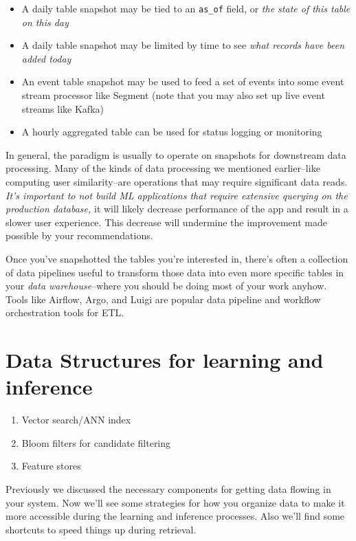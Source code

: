 \begin{itemize}
\item A daily table snapshot may be tied to an \lstinline{as_of} field, or \emph{the state of this table on this day}
\item A daily table snapshot may be limited by time to see \emph{what records have been added today}
\item An event table snapshot may be used to feed a set of events into some event stream processor like Segment (note that you may also set up live event streams like Kafka)
\item A hourly aggregated table can be used for status logging or monitoring
\end{itemize}

In general, the paradigm is usually to operate on snapshots for downstream data processing. Many of the kinds of data processing we mentioned earlier–like computing user similarity–are operations that may require significant data reads. \emph{It's important to not build ML applications that require extensive querying on the production database,} it will likely decrease performance of the app and result in a slower user experience. This decrease will undermine the improvement made possible by your recommendations. 

Once you've snapshotted the tables you're interested in, there's often a collection of data pipelines useful to transform those data into even more specific tables in your \emph{data warehouse}–where you should be doing most of your work anyhow. Tools like Airflow, Argo, and Luigi are popular data pipeline and workflow orchestration tools for ETL. 

\section{Data Structures for learning and inference}

\begin{enumerate}
    \item Vector search/ANN index
    \item Bloom filters for candidate filtering
    \item Feature stores
\end{enumerate}

Previously we discussed the necessary components for getting data flowing in your system. Now we'll see some strategies for how you organize data to make it more accessible during the learning and inference processes. Also we'll find some shortcuts to speed things up during retrieval. 

